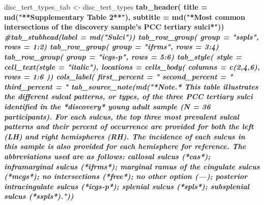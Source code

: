 \documentclass[
]{article}
\newenvironment{Shaded}{\begin{snugshade}}{\end{snugshade}}
\newcommand{\CommentTok}[1]{\textcolor[rgb]{0.56,0.35,0.01}{\textit{#1}}}
\newcommand{\DataTypeTok}[1]{\textcolor[rgb]{0.13,0.29,0.53}{#1}}
\newcommand{\DecValTok}[1]{\textcolor[rgb]{0.00,0.00,0.81}{#1}}
\newcommand{\KeywordTok}[1]{\textcolor[rgb]{0.13,0.29,0.53}{\textbf{#1}}}
\newcommand{\NormalTok}[1]{#1}
\newcommand{\OperatorTok}[1]{\textcolor[rgb]{0.81,0.36,0.00}{\textbf{#1}}}
\newcommand{\StringTok}[1]{\textcolor[rgb]{0.31,0.60,0.02}{#1}}
\begin{document}
\begin{Shaded}
\begin{Highlighting}[]
\NormalTok{disc_tert_types_tab <-}\StringTok{ }\NormalTok{disc_tert_types }\OperatorTok{%>%}\StringTok{ }\KeywordTok{gt}\NormalTok{() }\OperatorTok{%>%}
\KeywordTok{tab_header}\NormalTok{(}
  \DataTypeTok{title =} \KeywordTok{md}\NormalTok{(}\StringTok{"**Supplementary Table 2**"}\NormalTok{),}
  \DataTypeTok{subtitle =} \KeywordTok{md}\NormalTok{(}\StringTok{"*Most common intersections of the discovery sample's PCC tertiary sulci*"}\NormalTok{)) }\OperatorTok{%>%}
\CommentTok{#tab_stubhead(label = md("Sulci")) %>%}
\KeywordTok{tab_row_group}\NormalTok{(}
    \DataTypeTok{group =} \StringTok{"sspls"}\NormalTok{,}
    \DataTypeTok{rows =} \DecValTok{1}\OperatorTok{:}\DecValTok{2}\NormalTok{) }\OperatorTok{%>%}
\KeywordTok{tab_row_group}\NormalTok{(}
    \DataTypeTok{group =} \StringTok{"ifrms"}\NormalTok{,}
    \DataTypeTok{rows =} \DecValTok{3}\OperatorTok{:}\DecValTok{4}\NormalTok{) }\OperatorTok{%>%}
\KeywordTok{tab_row_group}\NormalTok{(}
    \DataTypeTok{group =} \StringTok{"icgs-p"}\NormalTok{,}
    \DataTypeTok{rows =} \DecValTok{5}\OperatorTok{:}\DecValTok{6}\NormalTok{) }\OperatorTok{%>%}
\KeywordTok{tab_style}\NormalTok{(}
    \DataTypeTok{style =} \KeywordTok{cell_text}\NormalTok{(}\DataTypeTok{style =} \StringTok{"italic"}\NormalTok{),}
    \DataTypeTok{locations =} \KeywordTok{cells_body}\NormalTok{(}
      \DataTypeTok{columns =} \KeywordTok{c}\NormalTok{(}\DecValTok{2}\NormalTok{,}\DecValTok{4}\NormalTok{,}\DecValTok{6}\NormalTok{),}
      \DataTypeTok{rows =} \DecValTok{1}\OperatorTok{:}\DecValTok{6}
\NormalTok{    )) }\OperatorTok{%>%}
\KeywordTok{cols_label}\NormalTok{(}
    \DataTypeTok{first_percent =} \StringTok{"%"}\NormalTok{,}
    \DataTypeTok{second_percent =} \StringTok{"%"}\NormalTok{,}
    \DataTypeTok{third_percent =} \StringTok{"%"}\NormalTok{) }\OperatorTok{%>%}
\KeywordTok{tab_source_note}\NormalTok{(}\KeywordTok{md}\NormalTok{(}\StringTok{"*Note.* This table illustrates the different sulcal patterns, or types, of the three PCC tertiary sulci identified in the *discovery* young adult sample (N = 36 participants). For each sulcus, the top three most prevalent sulcal patterns and their percent of occurrence are provided for both the left (LH) and right hemispheres (RH). The incidence of each sulcus in this sample is also provided for each hemisphere for reference. The abbreviations used are as follows: callosal sulcus (*cas*); inframarginal sulcus (*ifrms*); marginal ramus of the cingulate sulcus (*mcgs*); no intersections (*free*); no other option (---); posterior intracingulate sulcus (*icgs-p*); splenial sulcus (*spls*); subsplenial sulcus (*sspls*)."}\NormalTok{)) }\OperatorTok{%>%}
}}}}}}}}}}}
\end{Highlighting}
\end{Shaded}
\end{document}
